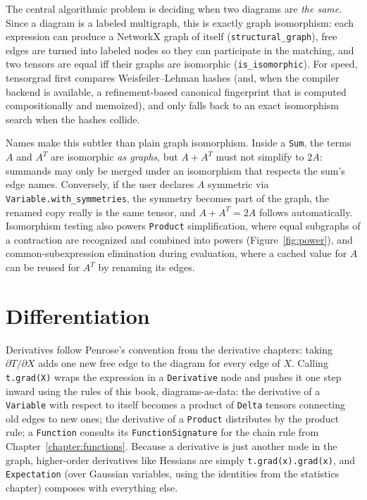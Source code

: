 The central algorithmic problem is deciding when two diagrams are \emph{the same}.
Since a diagram is a labeled multigraph, this is exactly graph isomorphism:
each expression can produce a NetworkX graph of itself
(\texttt{structural\_graph}), free edges are turned into labeled nodes so they
can participate in the matching, and two tensors are equal iff their graphs are
isomorphic (\texttt{is\_isomorphic}).
For speed, tensorgrad first compares Weisfeiler--Lehman hashes (and, when the
compiler backend is available, a refinement-based canonical fingerprint that is
computed compositionally and memoized), and only falls back to an exact
isomorphism search when the hashes collide.

Names make this subtler than plain graph isomorphism.
Inside a \texttt{Sum}, the terms $A$ and $A^T$ are isomorphic \emph{as graphs},
but $A + A^T$ must not simplify to $2A$: summands may only be merged under an
isomorphism that respects the sum's edge names.
Conversely, if the user declares
$A$ symmetric via \texttt{Variable.with\_symmetries}, the symmetry becomes part
of the graph, the renamed copy really is the same tensor, and $A + A^T = 2A$
follows automatically.
Isomorphism testing also powers \texttt{Product} simplification, where equal
subgraphs of a contraction are recognized and combined into powers
(Figure~\ref{fig:power}), and common-subexpression elimination during evaluation,
where a cached value for $A$ can be reused for $A^T$ by renaming its edges.

\begin{figure}[h]
\end{figure}

\section{Differentiation}

Derivatives follow Penrose's convention from the derivative chapters: taking
$\partial T/\partial X$ adds one new free edge to the diagram for every edge
of $X$.
Calling \texttt{t.grad(X)} wraps the expression in a \texttt{Derivative} node
and pushes it one step inward using the rules of this book, diagrams-as-data:
the derivative of a \texttt{Variable} with respect to itself becomes a product
of \texttt{Delta} tensors connecting old edges to new ones; the derivative of a
\texttt{Product} distributes by the product rule; a \texttt{Function} consults
its \texttt{FunctionSignature} for the chain rule from
Chapter~\ref{chapter:functions}.
Because a derivative is just another node in the graph, higher-order
derivatives like Hessians are simply \texttt{t.grad(x).grad(x)}, and
\texttt{Expectation} (over Gaussian variables, using the identities from the
statistics chapter) composes with everything else.

